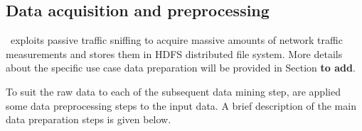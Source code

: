 \subsection{Data acquisition and preprocessing}
\label{Netacq}

\Nemico\ exploits passive traffic sniffing to acquire massive amounts of network traffic measurements and stores them in HDFS distributed file system.
More details about the specific use case data preparation will be provided in Section \textbf{to add}.
%



To suit the raw data to each of the subsequent data mining step, are applied some data preprocessing steps to the input data.
A brief description of the main data preparation steps is given below.

